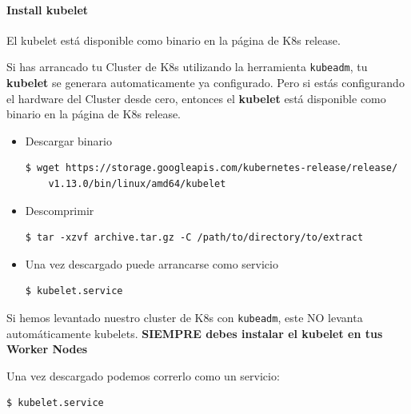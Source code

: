 \documentclass{article}
\newenvironment{blocktemplateIII}[1]{%
    \tcolorbox[beamer,%
    noparskip,breakable,
    ,colframe=Red,%
    colbacklower=LimeGreen!75!LightGreen,%
    title=#1]}%
    {\endtcolorbox}
\newenvironment{codetemplate}[1][]{%
  \mybasecolorbox[#1]
  \itshape
}{%
  \endmybasecolorbox
}
\begin{document}
\paragraph{Install kubelet}

El kubelet está disponible como binario en la página de K8s release.

Si has arrancado tu Cluster de K8s utilizando la herramienta \verb|kubeadm|, tu \textbf{kubelet} se generara automaticamente ya configurado. Pero si estás configurando el hardware del Cluster desde cero, entonces el \textbf{kubelet} está disponible como binario en la página de K8s release.

\begin{itemize}
    \item Descargar binario
\begin{codetemplate}{}
\begin{verbatim}
$ wget https://storage.googleapis.com/kubernetes-release/release/
    v1.13.0/bin/linux/amd64/kubelet
\end{verbatim}
\end{codetemplate}

    \item Descomprimir
\begin{codetemplate}{}
\begin{verbatim}
$ tar -xzvf archive.tar.gz -C /path/to/directory/to/extract
\end{verbatim}
\end{codetemplate} 

    \item Una vez descargado puede arrancarse como servicio
\begin{codetemplate}{}
\begin{verbatim}
$ kubelet.service
\end{verbatim}
\end{codetemplate}
\end{itemize}

\begin{blocktemplateIII}{Warning}
Si hemos levantado nuestro cluster de K8s con \verb|kubeadm|, este NO levanta automáticamente kubelets. \textbf{SIEMPRE debes instalar el kubelet en tus Worker Nodes}
\end{blocktemplateIII}

Una vez descargado podemos correrlo como un servicio:

\begin{codetemplate}{}
\begin{verbatim}
$ kubelet.service
\end{verbatim}
\end{codetemplate}
\end{document}
